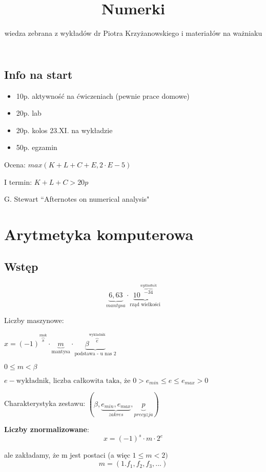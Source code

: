 \documentclass[hidelinks,a4paper,fleqn,oneside]{book}
\author{wiedza zebrana z wykładów dr Piotra Krzyżanowskiego i materiałów na ważniaku}
\title{Numerki}
\begin{document}
\linespread{1.0}
\maketitle

\tableofcontents

\clearpage

\section*{Info na start}

\begin{itemize}
	\item 10p. aktywność na ćwiczeniach (pewnie prace domowe)
	\item 20p. lab
	\item 20p. kolos 23.XI. na wykładzie
	\item 50p. egzamin
\end{itemize}

Ocena: $max(K + L + C + E, 2 \cdot E - 5)$

I termin: $K + L + C > 20p$

G. Stewart ``Afternotes on numerical analysis"

\chapter{Arytmetyka komputerowa}

\section{Wstęp}
\[
	\underbrace{6,63}_{mantysa} \cdot \underbrace{10^{\overbrace{-34}^{wykładnik}}}_{\textrm{rząd wielkości}}
\]

Liczby maszynowe:

$x = (-1)^{\overbrace{s}^{\textrm{znak}}} \cdot \underbrace{m}_{\textrm{mantysa}} \cdot \underbrace{\beta^{\overbrace{e}^{\textrm{wykładnik}}}}_{\textrm{podstawa - u nas 2}}$

$0 \leq m < \beta$

$e - \textrm{wykładnik, liczba całkowita taka, że } 0 > e_{min} \leq e \leq e_{max} > 0$

Charakterystyka zestawu: $(\beta, \underbrace{e_{min}, e_{max}}_{zakres}, \underbrace{p}_{precyzja})$

\textbf{Liczby znormalizowane}:
\[
	x = (-1)^s \cdot m \cdot 2^e
\]

ale zakładamy, że m jest postaci (a więc $1 \leq m < 2)$
\[
	m = (1.f_1,f_2,f_3,...)
\]
\end{document}
